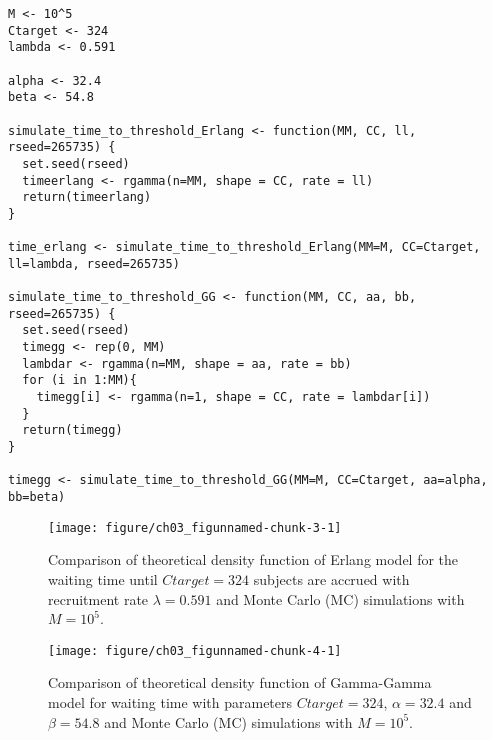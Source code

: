\begin{knitrout}
\color{fgcolor}\begin{kframe}
\begin{verbatim}
M <- 10^5
Ctarget <- 324
lambda <- 0.591

alpha <- 32.4
beta <- 54.8

simulate_time_to_threshold_Erlang <- function(MM, CC, ll, rseed=265735) {
  set.seed(rseed)
  timeerlang <- rgamma(n=MM, shape = CC, rate = ll)
  return(timeerlang)
}

time_erlang <- simulate_time_to_threshold_Erlang(MM=M, CC=Ctarget, ll=lambda, rseed=265735)

simulate_time_to_threshold_GG <- function(MM, CC, aa, bb, rseed=265735) {
  set.seed(rseed)
  timegg <- rep(0, MM)
  lambdar <- rgamma(n=MM, shape = aa, rate = bb)
  for (i in 1:MM){
    timegg[i] <- rgamma(n=1, shape = CC, rate = lambdar[i])
  }
  return(timegg)
}

timegg <- simulate_time_to_threshold_GG(MM=M, CC=Ctarget, aa=alpha, bb=beta) 
\end{verbatim}
\end{kframe}
\end{knitrout}

\begin{figure}
\begin{knitrout}
\color{fgcolor}
\texttt{[image: figure/ch03\_figunnamed-chunk-3-1]} 
\end{knitrout}
\caption{Comparison of theoretical density function of Erlang model for the waiting time until $Ctarget = 324$ subjects are accrued with recruitment rate $\lambda = 0.591$ and Monte Carlo (MC) simulations with $M=10^5$.}
\label{fig:3_3}
\end{figure}


\begin{figure}
\begin{knitrout}
\color{fgcolor}
\texttt{[image: figure/ch03\_figunnamed-chunk-4-1]} 
\end{knitrout}
\caption{Comparison of theoretical density function of Gamma-Gamma model for waiting time with parameters $Ctarget = 324$, $\alpha = 32.4$ and $\beta = 54.8$ and Monte Carlo (MC) simulations with $M=10^5$.}
\label{fig:3_4}
\end{figure}






